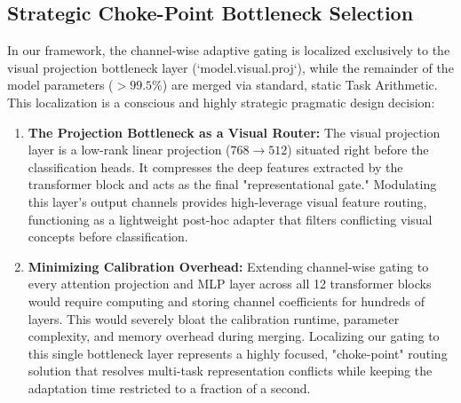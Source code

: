 \subsection{Strategic Choke-Point Bottleneck Selection}
\label{subsec:choke_point}
In our framework, the channel-wise adaptive gating is localized exclusively to the visual projection bottleneck layer (`model.visual.proj`), while the remainder of the model parameters ($>99.5\%$) are merged via standard, static Task Arithmetic. This localization is a conscious and highly strategic pragmatic design decision:
\begin{enumerate}
    \item \textbf{The Projection Bottleneck as a Visual Router:} The visual projection layer is a low-rank linear projection ($768 \to 512$) situated right before the classification heads. It compresses the deep features extracted by the transformer block and acts as the final "representational gate." Modulating this layer's output channels provides high-leverage visual feature routing, functioning as a lightweight post-hoc adapter that filters conflicting visual concepts before classification.
    \item \textbf{Minimizing Calibration Overhead:} Extending channel-wise gating to every attention projection and MLP layer across all 12 transformer blocks would require computing and storing channel coefficients for hundreds of layers. This would severely bloat the calibration runtime, parameter complexity, and memory overhead during merging. Localizing our gating to this single bottleneck layer represents a highly focused, "choke-point" routing solution that resolves multi-task representation conflicts while keeping the adaptation time restricted to a fraction of a second.
\end{enumerate}

